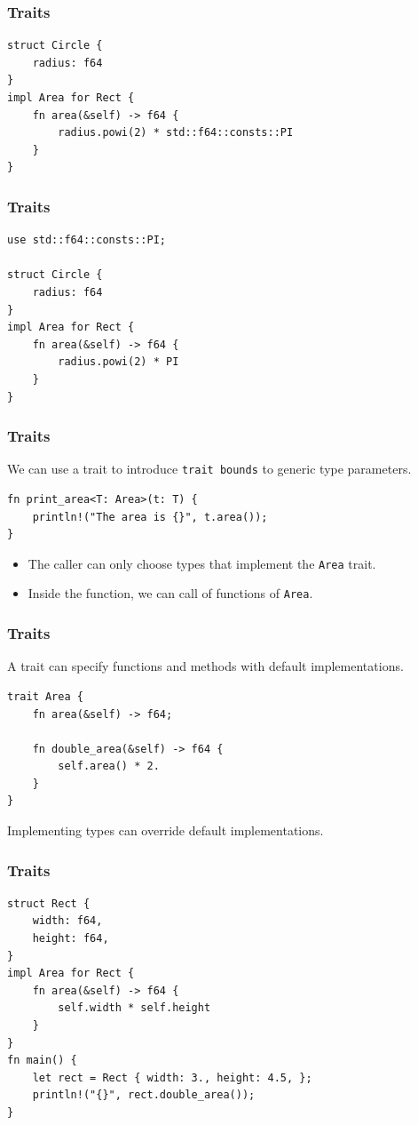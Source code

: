 \begin{frame}[fragile]
    \frametitle{Traits}
    \begin{verbatim}
struct Circle {
    radius: f64
}
impl Area for Rect {
    fn area(&self) -> f64 {
        radius.powi(2) * std::f64::consts::PI
    }
}
    \end{verbatim}
\end{frame}

\begin{frame}[fragile]
    \frametitle{Traits}
    \begin{verbatim}
use std::f64::consts::PI;

struct Circle {
    radius: f64
}
impl Area for Rect {
    fn area(&self) -> f64 {
        radius.powi(2) * PI
    }
}
    \end{verbatim}
\end{frame}

\begin{frame}[fragile]
    \frametitle{Traits}
    We can use a trait to introduce \texttt{trait bounds} to generic type parameters.
    \vfill
    \begin{verbatim}
fn print_area<T: Area>(t: T) {
    println!("The area is {}", t.area());
}
    \end{verbatim}
    \pause
    \vfill
    \begin{itemize}
        \item The caller can only choose types that implement the \texttt{Area} trait.
        \item Inside the function, we can call of functions of \texttt{Area}.
    \end{itemize}
\end{frame}

\begin{frame}[fragile]
    \frametitle{Traits}
    A trait can specify functions and methods with default implementations.
    \vfill
    \begin{verbatim}
trait Area {
    fn area(&self) -> f64;

    fn double_area(&self) -> f64 {
        self.area() * 2.
    }
}
    \end{verbatim}
    \pause
    \vfill
    Implementing types can override default implementations.
\end{frame}

\begin{frame}[fragile]
    \frametitle{Traits}
    \begin{verbatim}
struct Rect {
    width: f64,
    height: f64,
}
impl Area for Rect {
    fn area(&self) -> f64 {
        self.width * self.height
    }
}
fn main() {
    let rect = Rect { width: 3., height: 4.5, };
    println!("{}", rect.double_area());
}
    \end{verbatim}
\end{frame}


